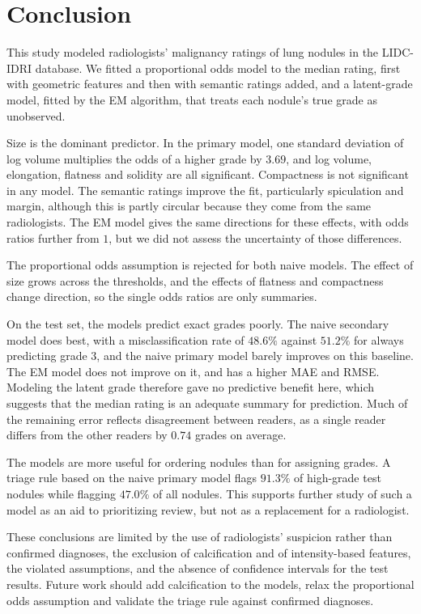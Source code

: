 \documentclass[12pt]{article}
\begin{document}
\section{Conclusion}

This study modeled radiologists' malignancy ratings of lung nodules in the
LIDC-IDRI database. We fitted a proportional odds model to the median rating,
first with geometric features and then with semantic ratings added, and a
latent-grade model, fitted by the EM algorithm, that treats each nodule's true
grade as unobserved.

Size is the dominant predictor. In the primary model, one standard deviation of
log volume multiplies the odds of a higher grade by $3.69$, and log volume,
elongation, flatness and solidity are all significant. Compactness is not
significant in any model. The semantic ratings improve the fit, particularly
spiculation and margin, although this is partly circular because they come from
the same radiologists. The EM model gives the same directions for these effects,
with odds ratios further from $1$, but we did not assess the uncertainty of
those differences.

The proportional odds assumption is rejected for both naive models. The effect of
size grows across the thresholds, and the effects of flatness and compactness
change direction, so the single odds ratios are only summaries.

On the test set, the models predict exact grades poorly. The naive secondary
model does best, with a misclassification rate of $48.6\%$ against $51.2\%$ for
always predicting grade $3$, and the naive primary model barely improves on this
baseline. The EM model does not improve on it, and has a higher MAE and RMSE.
Modeling the latent grade therefore gave no predictive benefit here, which
suggests that the median rating is an adequate summary for prediction. Much of
the remaining error reflects disagreement between readers, as a single reader
differs from the other readers by $0.74$ grades on average.

The models are more useful for ordering nodules than for assigning grades. A
triage rule based on the naive primary model flags $91.3\%$ of high-grade test
nodules while flagging $47.0\%$ of all nodules. This supports further study of
such a model as an aid to prioritizing review, but not as a replacement for a
radiologist.

These conclusions are limited by the use of radiologists' suspicion rather than
confirmed diagnoses, the exclusion of calcification and of intensity-based
features, the violated assumptions, and the absence of confidence intervals for
the test results. Future work should add calcification to the models, relax the
proportional odds assumption and validate the triage rule against confirmed
diagnoses.
\end{document}
